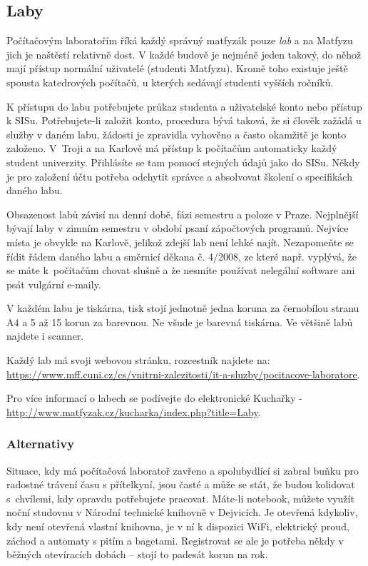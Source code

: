\subsection{Laby}
Počítačovým laboratořím říká každý správný matfyzák pouze \textit{lab} a na
Matfyzu jich je naštěstí relativně dost. V každé budově je nejméně jeden takový,
do něhož mají přístup normální uživatelé (studenti Matfyzu).
Kromě toho existuje ještě spousta katedrových počítačů, u kterých sedávají
studenti vyšších ročníků.

K přístupu do labu potřebujete průkaz studenta a uživatelské konto nebo přístup k SISu.
Potřebujete-li založit konto, procedura bývá taková, že si člověk zažádá u
služby v daném labu, žádosti je zpravidla vyhověno a často okamžitě je konto
založeno. V~Troji a na Karlově má přístup k počítačům automaticky každý student
univerzity. Přihlásíte se tam pomocí stejných údajů jako do SISu. Někdy je pro
založení účtu potřeba odchytit správce a absolvovat školení o specifikách daného
labu.

Obsazenost labů závisí na denní době, fázi semestru a poloze v Praze. Nejplnější
bývají laby v zimním semestru v období psaní zápočtových programů. Nejvíce místa
je obvykle na Karlově, jelikož zdejší lab není lehké najít. Nezapomeňte se řídit
řádem daného labu a
směrnicí děkana č. 4/2008, ze které např. vyplývá, že se máte k~počítačům chovat
slušně a že nesmíte používat nelegální software ani psát vulgární e-maily.

V každém labu je tiskárna, tisk stojí jednotně jedna koruna za černobílou stranu
A4 a 5 až 15 korun za barevnou. Ne všude je barevná tiskárna. Ve většině labů
najdete i scanner.

Každý lab má svoji webovou stránku, rozcestník najdete na: \url{https://www.mff.cuni.cz/cs/vnitrni-zalezitosti/it-a-sluzby/pocitacove-laboratore}.

Pro více informací o labech se podívejte do elektronické Kuchařky - \url{http://www.matfyzak.cz/kucharka/index.php?title=Laby}.



\subsubsection{Alternativy}
Situace, kdy má počítačová laboratoř zavřeno a spolubydlící si zabral buňku pro
radostné trávení času s přítelkyní, jsou časté a může se stát, že budou
kolidovat s~chvílemi, kdy opravdu potřebujete pracovat. Máte-li notebook, můžete
využít noční studovnu v Národní technické knihovně v Dejvicích. Je otevřená
kdykoliv, kdy není otevřená vlastní knihovna, je v ní k dispozici WiFi,
elektrický proud, záchod a automaty s pitím a bagetami. Registrovat se ale je
potřeba někdy v běžných otevíracích dobách – stojí to padesát korun na rok.